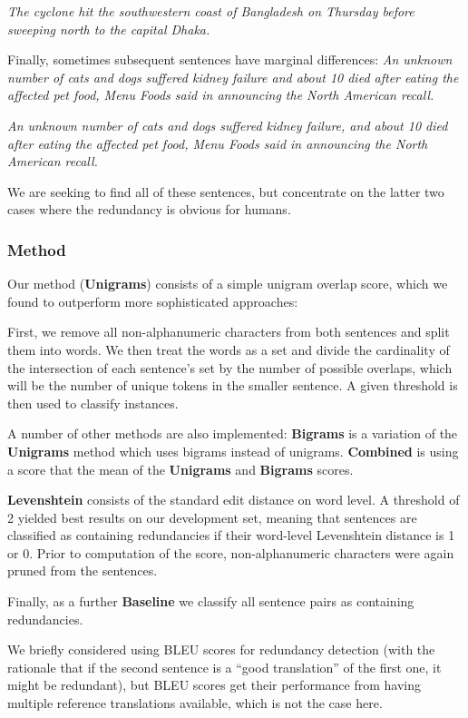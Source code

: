 \documentclass[a4paper,10pt]{scrartcl}
\theoremstyle{style}
\begin{document}
\textit{The cyclone hit the southwestern coast of Bangladesh on Thursday before sweeping north to the capital Dhaka.}

Finally, sometimes subsequent sentences have marginal differences:
\textit{An unknown number of cats and dogs suffered kidney failure and about 10 died after eating the affected pet food, Menu Foods said in announcing the North American recall.}

\textit{An unknown number of cats and dogs suffered kidney failure, and about 10 died after eating the affected pet food, Menu Foods said in announcing the North American recall.}

We are seeking to find all of these sentences, but concentrate on the latter two cases where the redundancy is obvious for humans.

\subsubsection{Method}

Our method (\textbf{Unigrams}) consists of a simple unigram overlap score, which we found to outperform more sophisticated approaches:

First, we remove all non-alphanumeric characters from both sentences and split them into words. We then treat the words as a set and divide the cardinality of the intersection of each sentence's set by the number of possible overlaps, which will be the number of unique tokens in the smaller sentence. A given threshold is then used to classify instances.

A number of other methods are also implemented: \textbf{Bigrams} is a variation of the \textbf{Unigrams} method which uses bigrams instead of unigrams. \textbf{Combined} is using a score that the mean of the \textbf{Unigrams} and \textbf{Bigrams} scores.

\textbf{Levenshtein} consists of the standard edit distance\citep{levenshtein1966binary} on word level. A threshold of 2 yielded best results on our development set, meaning that sentences are classified as containing redundancies if their word-level Levenshtein distance is 1 or 0. Prior to computation of the score, non-alphanumeric characters were again pruned from the sentences.

Finally, as a further \textbf{Baseline} we classify all sentence pairs as containing redundancies.

We briefly considered using BLEU scores \citep{papineni2002bleu} for redundancy detection (with the rationale that if the second sentence is a ``good translation'' of the first one, it might be redundant), but BLEU scores get their performance from having multiple reference translations available, which is not the case here.
\end{document}
